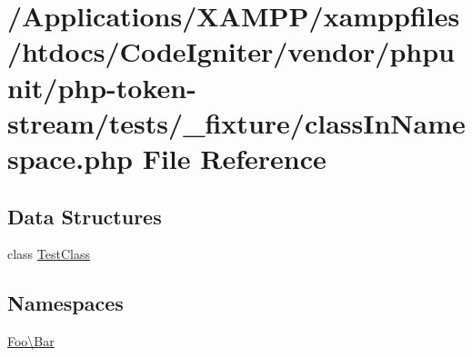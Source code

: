 \hypertarget{class_in_namespace_8php}{}\section{/\+Applications/\+X\+A\+M\+P\+P/xamppfiles/htdocs/\+Code\+Igniter/vendor/phpunit/php-\/token-\/stream/tests/\+\_\+fixture/class\+In\+Namespace.php File Reference}
\label{class_in_namespace_8php}
\subsection*{Data Structures}
\begin{DoxyCompactItemize}
\item 
class \mbox{\hyperlink{class_foo_1_1_bar_1_1_test_class}{Test\+Class}}
\end{DoxyCompactItemize}
\subsection*{Namespaces}
\begin{DoxyCompactItemize}
\item 
 \mbox{\hyperlink{namespace_foo_1_1_bar}{Foo\textbackslash{}\+Bar}}
\end{DoxyCompactItemize}
